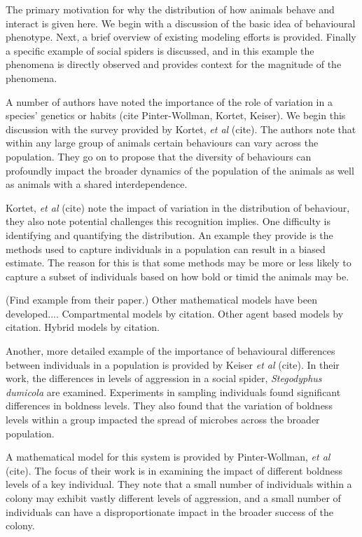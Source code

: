 \documentclass[12pt]{article}
\begin{document}
The primary motivation for why the distribution of how animals behave
and interact is given here. We begin with a discussion of the basic
idea of behavioural phenotype. Next, a brief overview of existing
modeling efforts is provided. Finally a specific example of social
spiders is discussed, and in this example the phenomena is directly
observed and provides context for the magnitude of the phenomena.

A number of authors have noted the importance of the role of variation
in a species' genetics or habits (cite Pinter-Wollman, Kortet,
Keiser). We begin this discussion with the survey provided by Kortet,
\textit{et al} (cite). The authors note that within any large group of
animals certain behaviours can vary across the population. They go on
to propose that the diversity of behaviours can profoundly impact the
broader dynamics of the population of the animals as well as animals
with a shared interdependence.

Kortet, \textit{et al} (cite) note the impact of variation in the
distribution of behaviour, they also note potential challenges this
recognition implies. One difficulty is identifying and quantifying the
distribution. An example they provide is the methods used to capture
individuals in a population can result in a biased estimate. The
reason for this is that some methods may be more or less likely to
capture a subset of individuals based on how bold or timid the animals
may be.

(Find example from their paper.)  Other mathematical models have been
developed.... Compartmental models by citation. Other agent based
models by citation. Hybrid models by citation.

Another, more detailed example of the importance of behavioural
differences between individuals in a population is provided by Keiser
\textit{et al} (cite). In their work, the differences in levels of
aggression in a social spider, \textit{Stegodyphus dumicola} are
examined. Experiments in sampling individuals found significant
differences in boldness levels. They also found that the variation of
boldness levels within a group impacted the spread of microbes across
the broader population.

A mathematical model for this system is provided by Pinter-Wollman,
\textit{et al} (cite). The focus of their work is in examining the
impact of different boldness levels of a key individual.  They note
that a small number of individuals within a colony may exhibit vastly
different levels of aggression, and a small number of individuals can
have a disproportionate impact in the broader success of the colony.
\end{document}
